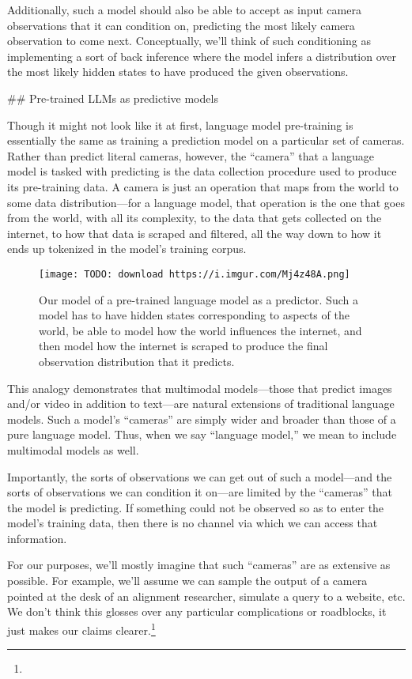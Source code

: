 {Additionally, such a model should also be able to accept as input camera observations that it can condition on, predicting the most likely camera observation to come next. Conceptually, we'll think of such conditioning as implementing a sort of back inference where the model infers a distribution over the most likely hidden states to have produced the given observations.


## Pre-trained LLMs as predictive models

Though it might not look like it at first, language model pre-training is essentially the same as training a prediction model on a particular set of cameras. Rather than predict literal cameras, however, the ``camera'' that a language model is tasked with predicting is the data collection procedure used to produce its pre-training data. A camera is just an operation that maps from the world to some data distribution---for a language model, that operation is the one that goes from the world, with all its complexity, to the data that gets collected on the internet, to how that data is scraped and filtered, all the way down to how it ends up tokenized in the model's training corpus.

\begin{figure}[h!]
  \centering
  \texttt{[image: TODO: download https://i.imgur.com/Mj4z48A.png]}
  \caption{Our model of a pre-trained language model as a predictor. Such a model has to have hidden states corresponding to aspects of the world, be able to model how the world influences the internet, and then model how the internet is scraped to produce the final observation distribution that it predicts.}
\end{figure}

This analogy demonstrates that multimodal models---those that predict images and/or video in addition to text---are natural extensions of traditional language models. Such a model's ``cameras'' are simply wider and broader than those of a pure language model. Thus, when we say ``language model,'' we mean to include multimodal models as well.

Importantly, the sorts of observations we can get out of such a model---and the sorts of observations we can condition it on---are limited by the ``cameras'' that the model is predicting. If something could not be observed so as to enter the model's training data, then there is no channel via which we can access that information.

For our purposes, we'll mostly imagine that such ``cameras'' are as extensive as possible. For example, we'll assume we can sample the output of a camera pointed at the desk of an alignment researcher, simulate a query to a website, etc. We don't think this glosses over any particular complications or roadblocks, it just makes our claims clearer.\footnote{}

}
